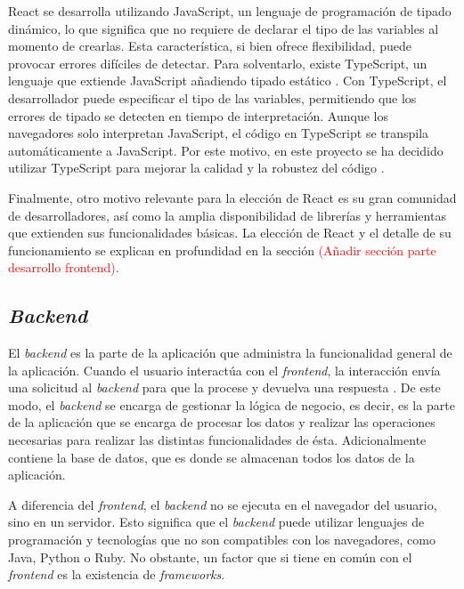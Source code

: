 React se desarrolla utilizando JavaScript, un lenguaje de programación de tipado dinámico, lo que significa que no requiere de declarar el tipo de las variables al momento de crearlas. Esta característica, si bien ofrece flexibilidad, puede provocar errores difíciles de detectar. Para solventarlo, existe TypeScript, un lenguaje que extiende JavaScript añadiendo tipado estático \cite{typescript}. Con TypeScript, el desarrollador puede especificar el tipo de las variables, permitiendo que los errores de tipado se detecten en tiempo de interpretación. Aunque los navegadores solo interpretan JavaScript, el código en TypeScript se transpila automáticamente a JavaScript. Por este motivo, en este proyecto se ha decidido utilizar TypeScript para mejorar la calidad y la robustez del código \cite{tipado}.

Finalmente, otro motivo relevante para la elección de React es su gran comunidad de desarrolladores, así como la amplia disponibilidad de librerías y herramientas que extienden sus funcionalidades básicas. La elección de React y el detalle de su funcionamiento se explican en profundidad en la sección \textcolor{red}{(Añadir sección parte desarrollo frontend)}.

\subsection{\textit{Backend}}
\label{subsec:backend}

El \textit{backend} es la parte de la aplicación que administra la funcionalidad general de la aplicación. Cuando el usuario interactúa con el \textit{frontend}, la interacción envía una solicitud al \textit{backend} para que la procese y devuelva una respuesta \cite{aws_frontend_backend}. De este modo, el \textit{backend} se encarga de gestionar la lógica de negocio, es decir, es la parte de la aplicación que se encarga de procesar los datos y realizar las operaciones necesarias para realizar las distintas funcionalidades de ésta. Adicionalmente contiene la base de datos, que es donde se almacenan todos los datos de la aplicación.

A diferencia del \textit{frontend}, el \textit{backend} no se ejecuta en el navegador del usuario, sino en un servidor. Esto significa que el \textit{backend} puede utilizar lenguajes de programación y tecnologías que no son compatibles con los navegadores, como Java, Python o Ruby. No obstante, un factor que si tiene en común con el \textit{frontend} es la existencia de \textit{frameworks}.

